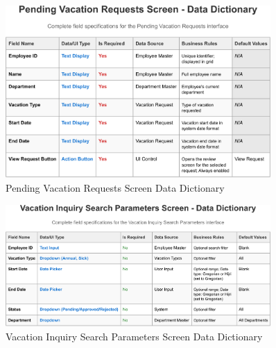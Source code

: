 \documentclass[12pt,a4paper]{article}
\begin{document}
\begin{figure}[H]
\centering
\includegraphics[width=0.9\textwidth]{Data-Dictionary/Screen-Data-Dictionaries/Pending-Vacation-Requests-Screen-Data-Dictionary/Pending-Vacation-Requests-Screen-Data-Dictionary-1.png}
\caption{Pending Vacation Requests Screen Data Dictionary}
\label{fig:pending-vacation-requests-data-dict}
\end{figure}

\begin{figure}[H]
\centering
\includegraphics[width=0.9\textwidth]{Data-Dictionary/Screen-Data-Dictionaries/Vacation-Inquiry-Search-Parameters-Screen-Data-Dictionary/Vacation-Inquiry-Search-Parameters-Screen-Data-Dictionary-1.png}
\caption{Vacation Inquiry Search Parameters Screen Data Dictionary}
\label{fig:inquiry-search-params-data-dict}
\end{figure}
\end{document}
